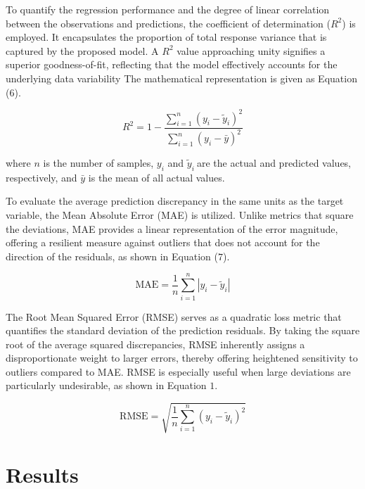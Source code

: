 \documentclass[
]{article}
\begin{document}
To quantify the regression performance and the degree of linear
correlation between the observations and predictions, the coefficient of
determination (\(R^{2}\)) is employed. It encapsulates the proportion of
total response variance that is captured by the proposed model. A
\(R^{2}\) value approaching unity signifies a superior goodness-of-fit,
reflecting that the model effectively accounts for the underlying data
variability The mathematical representation is given as Equation
(\(6\)).

\begin{equation}
R^{2} = 1 - \frac{\sum_{i = 1}^{n}\left( y_{i} - {\widetilde{y}}_{i} \right)^{2}}{\sum_{i = 1}^{n}\left( y_{i} - \bar{y} \right)^{2}}
\tag{6}
\end{equation}

where \(n\) is the number of samples, \(y_{i}\) and
\({\widetilde{y}}_{i}\ \)are the actual and predicted values,
respectively, and \(\bar{y}\) is the mean of all actual values.

To evaluate the average prediction discrepancy in the same units as the
target variable, the Mean Absolute Error (MAE) is utilized. Unlike
metrics that square the deviations, MAE provides a linear representation
of the error magnitude, offering a resilient measure against outliers
that does not account for the direction of the residuals, as shown in
Equation (\(7\)).

\begin{equation}
\text{MAE} = \frac{1}{n}\sum_{i = 1}^{n}{|y_{i} - {\widetilde{y}}_{i}|}
\tag{7}
\end{equation}

The Root Mean Squared Error (RMSE) serves as a quadratic loss metric
that quantifies the standard deviation of the prediction residuals. By
taking the square root of the average squared discrepancies, RMSE
inherently assigns a disproportionate weight to larger errors, thereby
offering heightened sensitivity to outliers compared to MAE. RMSE is
especially useful when large deviations are particularly undesirable, as
shown in Equation \(1\).

\begin{equation}
\text{RMSE} = \sqrt{\frac{1}{n}\sum_{i = 1}^{n}{(y_{i} - {\widetilde{y}}_{i})}^{2}}
\tag{8}
\end{equation}

\hypertarget{results}{%
\section{Results}\label{results}}
\end{document}
